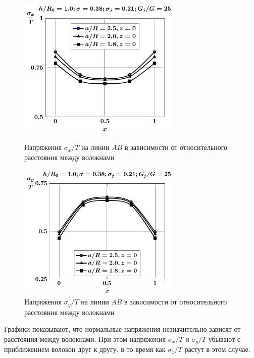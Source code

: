 \begin{figure}[h!]
\centering\footnotesize
\parbox[b]{7.5cm}{\centering\includegraphics[width=7.8cm]{inc5-a-sig_x.pdf}
\caption{Напряжения $\sigma_x/T$ на линии $AB$ в зависимости от относительного расстояния между волокнами
\label{f:7:74}}}\hfil\hfil
\parbox[b]{7.5cm}{\centering\includegraphics[width=7.8cm]{inc5-a-sig_y.pdf}
\caption{Напряжения $\sigma_y/T$ на линии $AB$ в зависимости от относительного расстояния между волокнами
\label{f:7:75}}}
\end{figure}

Графики показывают, что нормальные напряжения незначительно зависят от расстояния между волокнами. При этом напряжения $\sigma_x/T$ и $\sigma_y/T$ убывают с приближением волокон друг к другу, в то время как $\sigma_z/T$ растут в этом случае.

